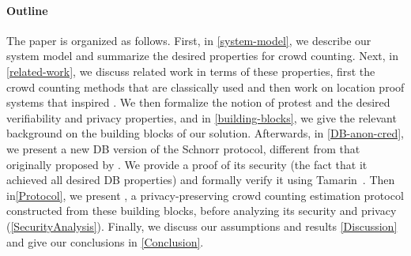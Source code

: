 \paragraph*{Outline}

The paper is organized as follows.
First, in \cref{system-model}, we describe our system model and summarize the desired properties for crowd counting. Next, in \cref{related-work}, we discuss related work in terms of these properties, first the crowd counting methods that are classically used and then work on location proof systems that inspired \CROCUS. 
We then formalize the notion of protest and the desired verifiability and privacy properties, and in \cref{building-blocks}, we give the relevant background on the building blocks of our solution. 
Afterwards, in \cref{DB-anon-cred}, we present a new \ac{DB} version of the Schnorr protocol, different from that originally proposed by \textcite{DistanceBounding}.
We provide a proof of its security (\ie the fact that it achieved all desired \ac{DB} properties) 
and formally verify it using Tamarin~\cite{TamarinDB}.
Then in\cref{Protocol}, we present \CROCUS, a privacy-preserving crowd counting estimation protocol constructed from these building blocks, before analyzing its security and privacy (\cref{SecurityAnalysis}).
Finally, we discuss our assumptions and results \cref{Discussion} and give our conclusions in \cref{Conclusion}.
